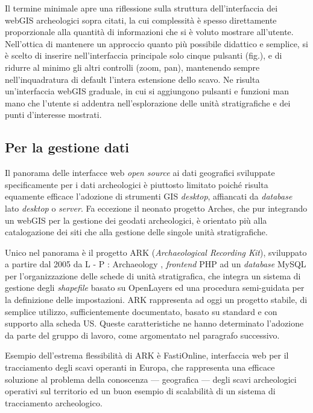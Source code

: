 \documentclass{paper}
\begin{document}
        Il termine minimale apre una riflessione sulla struttura dell'interfaccia dei webGIS archeologici sopra citati, la cui complessità è spesso direttamente proporzionale alla quantità di informazioni che si è voluto mostrare all'utente. Nell'ottica di mantenere un approccio quanto più possibile didattico e semplice, si è scelto di inserire nell'interfaccia principale solo cinque pulsanti (fig.), e di ridurre al minimo gli altri controlli (zoom, pan), mantenendo sempre nell'inquadratura di default l'intera estensione dello scavo. Ne risulta un'interfaccia webGIS graduale, in cui si aggiungono pulsanti e funzioni man mano che l'utente si addentra nell'esplorazione delle unità stratigrafiche e dei punti d'interesse mostrati. 

    \subsection{Per la gestione dati}

        Il panorama delle interfacce web \textit{open source} ai dati geografici sviluppate specificamente per i dati archeologici è piuttosto limitato poiché risulta equamente efficace l'adozione di strumenti GIS \textit{desktop}, affiancati da \textit{database} lato \textit{desktop} o \textit{server}. Fa eccezione il neonato progetto Arches, che pur integrando un webGIS per la gestione dei geodati archeologici, è orientato più alla catalogazione dei siti che alla gestione delle singole unità stratigrafiche.

        Unico nel panorama è il progetto ARK (\textit{Archaeological Recording Kit}), sviluppato a partire dal 2005 da L - P : Archaeology \cite{ark-framework}, \textit{frontend} PHP ad un \textit{database} MySQL per l'organizzazione delle schede di unità stratigrafica, che integra un sistema di gestione degli \textit{shapefile} basato su OpenLayers ed una procedura semi-guidata per la definizione delle impostazioni. ARK rappresenta ad oggi un progetto stabile, di semplice utilizzo, sufficientemente documentato, basato su standard e con supporto alla scheda US. Queste caratteristiche ne hanno determinato l'adozione da parte del gruppo di lavoro, come argomentato nel paragrafo successivo.

        Esempio dell'estrema flessibilità di ARK è FastiOnline, interfaccia web per il tracciamento degli scavi operanti in Europa, che rappresenta una efficace soluzione al problema della conoscenza --- geografica --- degli scavi archeologici operativi sul territorio ed un buon esempio di scalabilità di un sistema di tracciamento archeologico.
\end{document}
